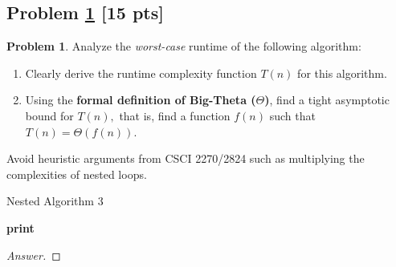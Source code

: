 \documentclass[11pt]{article}
\theoremstyle{definition}
\theoremstyle{definition}
\newtheorem{required}{Problem}
\theoremstyle{definition}
\begin{document}
\subsection{Problem \ref{Analyzecode1} [15 pts]} 
\begin{required} \label{Analyzecode1}
Analyze the \textit{worst-case} runtime of the following algorithm: 
\begin{enumerate}
    \item Clearly derive the runtime complexity function $T(n)$ for this algorithm.
    \item Using the \textbf{formal definition of Big-Theta ($\Theta$)}, find a tight asymptotic bound for $T(n),$ that is, find a function $f(n)$ such that $T(n) = \Theta(f(n))$.
\end{enumerate}

Avoid heuristic arguments from CSCI 2270/2824 such as multiplying the
complexities of nested loops.

\begin{algorithm}
\caption{Nested Algorithm 3}\label{alg:NestedDependent1}
\begin{algorithmic}[1]
		\State \textbf{print} 
	\EndFor
\EndFor
\EndProcedure
\end{algorithmic}
\end{algorithm}

\begin{proof}[Answer]
\end{proof}
\end{required}

\newpage
\end{document}
